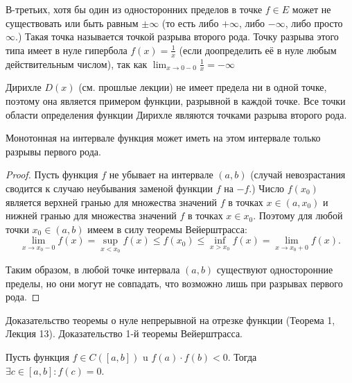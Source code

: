 В-третьих, хотя бы один из односторонних пределов в точке $f \in E$ может не существовать или быть равным $\pm \infty$ (то есть либо $+\infty$, либо $-\infty$, либо просто $\infty$.) Такая точка называется точкой разрыва второго рода. Точку разрыва этого типа имеет в нуле гипербола $f(x)=\frac{1}{x}$ (если доопределить её в нуле любым действительным числом), так как $\lim _{x \rightarrow 0-0} \frac{1}{x}=-\infty$

Дирихле $D(x)$ (см. прошлые лекции) не имеет предела ни в одной точке, поэтому она является примером функции, разрывной в каждой точке. Все точки области определения функции Дирихле являются точками разрыва второго рода.

\begin{proposition}
    Монотонная на интервале функция может иметь на этом интервале только разрывы первого рода.
\end{proposition}

\begin{proof}
    Пусть функция $f$ не убывает на интервале $(a, b)$ (случай невозрастания сводится к случаю неубывания заменой функции $f$ на $-f$.) Число $f\left(x_0\right)$ является верхней гранью для множества значений $f$ в точках $x \in\left(a, x_0\right)$ и нижней гранью для множества значений $f$ в точках $x \in x_0$. Поэтому для любой точки $x_0 \in(a, b)$ имеем в силу теоремы Вейерштрасса:
    $$
        \lim _{x \rightarrow x_0-0} f(x)=\sup _{x<x_0} f(x) \leq f\left(x_0\right) \leq \inf _{x>x_0} f(x)=\lim _{x \rightarrow x_0+0} f(x) .
    $$

    Таким образом, в любой точке интервала $(a, b)$ существуют односторонние пределы, но они могут не совпадать, что возможно лишь при разрывах первого рода.
\end{proof}

\newpage
\begin{problem}
Доказательство теоремы о нуле непрерывной на отрезке функции (Теорема 1, Лекция
13). Доказательство 1-й теоремы Вейерштрасса.
\end{problem}
\begin{theorem}
    Пусть функция $f \in C([a, b])$ u $f(a) \cdot f(b)<0$. Тогда $\exists c \in[a, b]: f(c)=0$.
\end{theorem}

